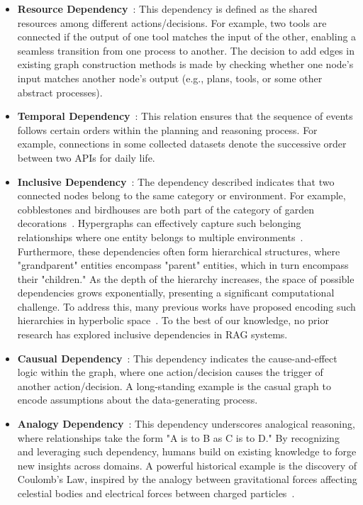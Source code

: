 \begin{itemize}[leftmargin=*]
    \item \textbf{Resource Dependency}~\cite{shen2023taskbench, song2023restgpt, wu2024can}: This dependency is defined as the shared resources among different actions/decisions. For example, two tools are connected if the output of one tool matches the input of the other, enabling a seamless transition from one process to another. The decision to add edges in existing graph construction methods is made by checking whether one node's input matches another node's output (e.g., plans, tools, or some other abstract processes).
    

    \item \textbf{Temporal Dependency}~\cite{shen2023taskbench}: This relation ensures that the sequence of events follows certain orders within the planning and reasoning process. For example, connections in some collected datasets denote the successive order between two APIs for daily life.


    \item \textbf{Inclusive Dependency}~\cite{ma2024harec}: The dependency described indicates that two connected nodes belong to the same category or environment. For example, cobblestones and birdhouses are both part of the category of garden decorations~\cite{wang2024knowledge2}. Hypergraphs can effectively capture such belonging relationships where one entity belongs to multiple environments~\cite{feng2019hypergraph}. Furthermore, these dependencies often form hierarchical structures, where "grandparent" entities encompass "parent" entities, which in turn encompass their "children." As the depth of the hierarchy increases, the space of possible dependencies grows exponentially, presenting a significant computational challenge. To address this, many previous works have proposed encoding such hierarchies in hyperbolic space~\cite{ma2024harec, liu2019hyperbolic, zhang2024hierarchical}. To the best of our knowledge, no prior research has explored inclusive dependencies in RAG systems.
    

    \item \textbf{Causual Dependency}~\cite{lin2024graph}: This dependency indicates the cause-and-effect logic within the graph, where one action/decision causes the trigger of another action/decision. A long-standing example is the casual graph to encode assumptions about the data-generating process.


    \item \textbf{Analogy Dependency}~\cite{yu2023thought, yuan2023analogykb}: This dependency underscores analogical reasoning, where relationships take the form "A is to B as C is to D." By recognizing and leveraging such dependency, humans build on existing knowledge to forge new insights across domains. A powerful historical example is the discovery of Coulomb's Law, inspired by the analogy between gravitational forces affecting celestial bodies and electrical forces between charged particles~\cite{priestley1775history}.
\end{itemize}


